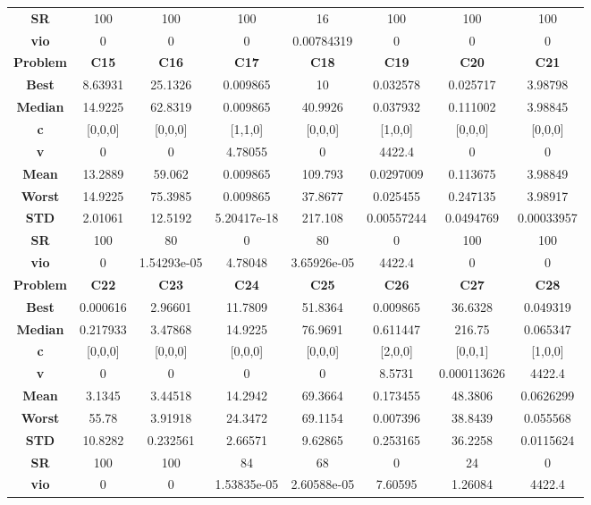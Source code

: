 \documentclass{IEEEtran}
\begin{document}
\begin{center}
\begin{tabular}{|c|c|c|c|c|c|c|c|}
    \textbf{SR} & 100 & 100 & 100 & 16 & 100 & 100 & 100\\ 
    \textbf{vio} & 0 & 0 & 0 & 0.00784319 & 0 & 0 & 0\\ 
    \hline 
    \hline 
    \textbf{Problem} & \textbf{C15} & \textbf{C16} & \textbf{C17} & \textbf{C18} & \textbf{C19} & \textbf{C20} & \textbf{C21} \\ 
    \hline\hline 
    \textbf{Best} & 8.63931 & 25.1326 & 0.009865 & 10 & 0.032578 & 0.025717 & 3.98798\\ 
    \textbf{Median} & 14.9225 & 62.8319 & 0.009865 & 40.9926 & 0.037932 & 0.111002 & 3.98845\\ 
    \textbf{c} & [0,0,0] & [0,0,0] & [1,1,0] & [0,0,0] & [1,0,0] & [0,0,0] & [0,0,0]\\ 
    \textbf{v} & 0 & 0 & 4.78055 & 0 & 4422.4 & 0 & 0\\ 
    \textbf{Mean} & 13.2889 & 59.062 & 0.009865 & 109.793 & 0.0297009 & 0.113675 & 3.98849\\ 
    \textbf{Worst} & 14.9225 & 75.3985 & 0.009865 & 37.8677 & 0.025455 & 0.247135 & 3.98917\\ 
    \textbf{STD} & 2.01061 & 12.5192 & 5.20417e-18 & 217.108 & 0.00557244 & 0.0494769 & 0.00033957\\ 
    \textbf{SR} & 100 & 80 & 0 & 80 & 0 & 100 & 100\\ 
    \textbf{vio} & 0 & 1.54293e-05 & 4.78048 & 3.65926e-05 & 4422.4 & 0 & 0\\ 
    \hline 
    \hline 
    \textbf{Problem} & \textbf{C22} & \textbf{C23} & \textbf{C24} & \textbf{C25} & \textbf{C26} & \textbf{C27} & \textbf{C28} \\ 
    \hline\hline 
    \textbf{Best} & 0.000616 & 2.96601 & 11.7809 & 51.8364 & 0.009865 & 36.6328 & 0.049319\\ 
    \textbf{Median} & 0.217933 & 3.47868 & 14.9225 & 76.9691 & 0.611447 & 216.75 & 0.065347\\ 
    \textbf{c} & [0,0,0] & [0,0,0] & [0,0,0] & [0,0,0] & [2,0,0] & [0,0,1] & [1,0,0]\\ 
    \textbf{v} & 0 & 0 & 0 & 0 & 8.5731 & 0.000113626 & 4422.4\\ 
    \textbf{Mean} & 3.1345 & 3.44518 & 14.2942 & 69.3664 & 0.173455 & 48.3806 & 0.0626299\\ 
    \textbf{Worst} & 55.78 & 3.91918 & 24.3472 & 69.1154 & 0.007396 & 38.8439 & 0.055568\\ 
    \textbf{STD} & 10.8282 & 0.232561 & 2.66571 & 9.62865 & 0.253165 & 36.2258 & 0.0115624\\ 
    \textbf{SR} & 100 & 100 & 84 & 68 & 0 & 24 & 0\\ 
    \textbf{vio} & 0 & 0 & 1.53835e-05 & 2.60588e-05 & 7.60595 & 1.26084 & 4422.4\\ 
    \hline 
  \end{tabular}
\end{center}
\newpage
\end{document}
